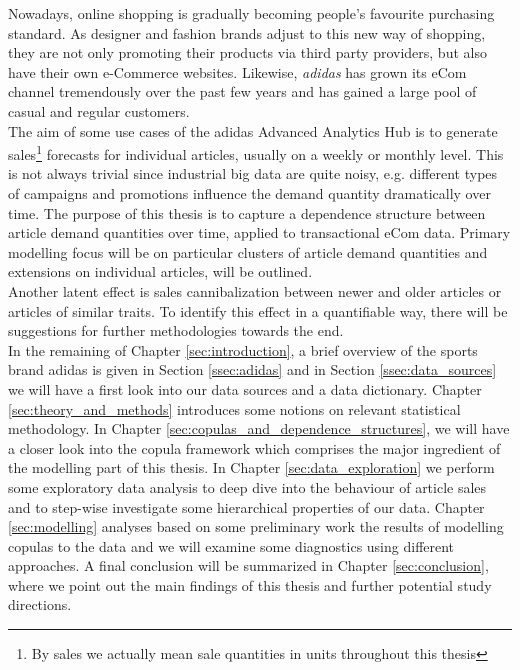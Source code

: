 

Nowadays, online shopping is gradually becoming people's favourite purchasing standard. As designer and fashion brands adjust to this new way of shopping, they are not only promoting their products via third party 	providers, but also have their own e-Commerce websites. Likewise, \textit{adidas} has grown its eCom channel tremendously over the past few years and has gained a large pool of casual and regular customers.\\

The aim of some use cases of the adidas Advanced Analytics Hub is to generate sales\footnote{By sales we actually mean sale quantities in units throughout this thesis} forecasts for individual articles, usually on a weekly or monthly level. This is not always trivial since industrial big data are quite noisy, e.g. different types of campaigns and promotions influence the demand quantity dramatically over time. The purpose of this thesis is to capture a dependence structure between article demand quantities over time, applied to transactional eCom data. Primary modelling focus will be on particular clusters of article demand quantities and extensions on individual articles, will be outlined. \\

Another latent effect is sales cannibalization between newer and older articles or articles of similar traits. To identify this effect in a quantifiable way, there will be suggestions for further methodologies towards the end. \\

In the remaining of Chapter \ref{sec:introduction}, a brief overview of the sports brand adidas is given in Section \ref{ssec:adidas} and in Section \ref{ssec:data_sources} we will have a first look into our data sources and a data dictionary. Chapter \ref{sec:theory_and_methods} introduces some notions on relevant statistical methodology. In Chapter \ref{sec:copulas_and_dependence_structures}, we will have a closer look into the copula framework which comprises the major ingredient of the modelling part of this thesis. In Chapter \ref{sec:data_exploration} we perform some exploratory data analysis to deep dive into the behaviour of article sales and to step-wise investigate some hierarchical properties of our data.  Chapter \ref{sec:modelling} analyses based on some preliminary work the results of modelling copulas to the data and we will examine some diagnostics using different approaches. A final conclusion will be summarized in Chapter \ref{sec:conclusion}, where we point out the main findings of this thesis and further potential study directions.




